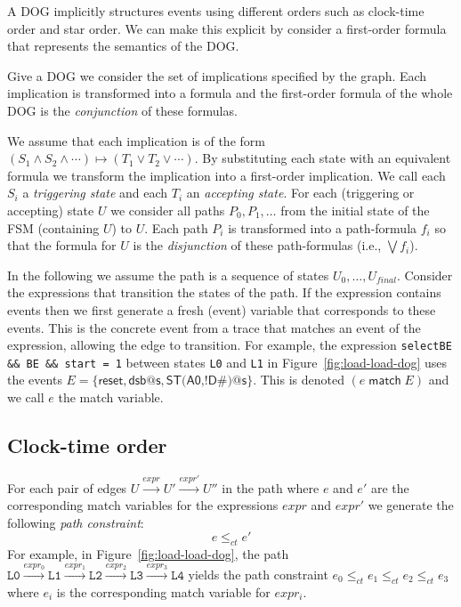\documentclass[10pt]{paper}
\newcommand{\state}[1]{\texttt{#1}}
\newcommand{\match}{\;\mathsf{match}\;}
\begin{document}
A DOG implicitly structures events using different orders such as clock-time order and star order.
%
We can make this explicit by consider a first-order formula that represents the semantics of the DOG.

Give a DOG we consider the set of implications specified by the graph.
%
Each implication is transformed into a formula and the first-order formula of the whole DOG is the \emph{conjunction} of these formulas.

We assume that each implication is of the form $(S_1 \wedge S_2 \wedge \cdots) \mapsto (T_1 \vee T_2 \vee \cdots)$.
%
By substituting each state with an equivalent formula we transform the implication into a first-order implication.
%
We call each $S_i$ a \emph{triggering state} and each $T_i$ an \emph{accepting state}.
%
For each (triggering or accepting) state $U$ we consider all paths $P_0, P_1, \dots$ from the initial state of the FSM (containing $U$) to $U$.
%
Each path $P_i$ is transformed into a path-formula $f_i$ so that the formula for $U$ is the \emph{disjunction} of these path-formulas (i.e., $\bigvee f_i$).

In the following we assume the path is a sequence of states $U_0, \dots, U_{final}$.
%
Consider the expressions that transition the states of the path.
%
If the expression contains events then we first generate a fresh (event) variable that corresponds to these events.
%
This is the concrete event from a trace that matches an event of the expression, allowing the edge to transition.
%
For example, the expression \texttt{selectBE \&\& BE \&\& start = 1} between states \state{L0} and \state{L1} in Figure~\ref{fig:load-load-dog} uses the events $E = \{\textsf{reset}, \textsf{dsb@s}, \textsf{ST(A0,!D\#)@s}\}$.
%
This is denoted $(e \match E)$ and we call $e$ the match variable.
%
\subsection{Clock-time order}
%
For each pair of edges $U \xrightarrow{expr} U' \xrightarrow{expr'} U''$ in the path where $e$ and $e'$ are the corresponding match variables for the expressions $expr$ and $expr'$ we generate the following \emph{path constraint}:
%
\[
e \leq_{ct} e'
\]
%
For example, in Figure~\ref{fig:load-load-dog}, the path $\state{L0} \xrightarrow{expr_0} \state{L1} \xrightarrow{expr_1} \state{L2} \xrightarrow{expr_2} \state{L3} \xrightarrow{expr_3} \state{L4}$ yields the path constraint $e_0 \leq_{ct} e_1 \leq_{ct} e_2 \leq_{ct} e_3$ where $e_i$ is the corresponding match variable for $expr_i$.
\end{document}
